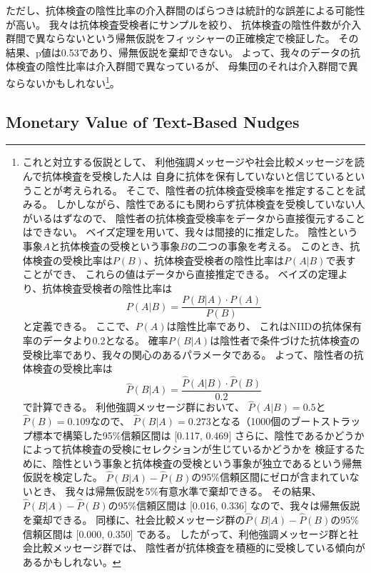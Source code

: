 \documentclass[
  11pt,
  a4paper,
]{article}
\begin{document}
ただし、抗体検査の陰性比率の介入群間のばらつきは統計的な誤差による可能性が高い。
我々は抗体検査受検者にサンプルを絞り、
抗体検査の陰性件数が介入群間で異ならないという帰無仮説をフィッシャーの正確検定で検証した。
その結果、p値は0.53であり、帰無仮説を棄却できない。
よって、我々のデータの抗体検査の陰性比率は介入群間で異なっているが、
母集団のそれは介入群間で異ならないかもしれない\footnote{これと対立する仮説として、
  利他強調メッセージや社会比較メッセージを読んで抗体検査を受検した人は
  自身に抗体を保有していないと信じているということが考えられる。
  そこで、陰性者の抗体検査受検率を推定することを試みる。
  しかしながら、陰性であるにも関わらず抗体検査を受検していない人がいるはずなので、
  陰性者の抗体検査受検率をデータから直接復元することはできない。
  ベイズ定理を用いて、我々は間接的に推定した。
  陰性という事象\(A\)と抗体検査の受検という事象\(B\)の二つの事象を考える。
  このとき、抗体検査の受検比率は\(P(B)\)、抗体検査受検者の陰性比率は\(P(A|B)\)で表すことができ、
  これらの値はデータから直接推定できる。
  ベイズの定理より、抗体検査受検者の陰性比率は
  \[ P(A|B) = \frac{P(B|A) \cdot P(A)}{P(B)} \]
  と定義できる。
  ここで、\(P(A)\)は陰性比率であり、
  これはNIIDの抗体保有率のデータより0.2となる。
  確率\(P(B|A)\)は陰性者で条件づけた抗体検査の受検比率であり、我々の関心のあるパラメータである。
  よって、陰性者の抗体検査の受検比率は
  \[ \hat{P}(B|A) = \frac{\hat{P}(A|B) \cdot \hat{P}(B)}{0.2} \]
  で計算できる。
  利他強調メッセージ群において、
  \(\hat{P}(A|B) = 0.5\)と\(\hat{P}(B) = 0.109\)なので、
  \(\hat{P}(B|A) = 0.273\)となる（1000個のブートストラップ標本で構築した95\%信頼区間は
  {[}0.117, 0.469{]}
  さらに、陰性であるかどうかによって抗体検査の受検にセレクションが生じているかどうかを
  検証するために、陰性という事象と抗体検査の受検という事象が独立であるという帰無仮説を検定した。
  \(\hat{P}(B|A) - \hat{P}(B)\)の95\%信頼区間にゼロが含まれていないとき、
  我々は帰無仮説を5\%有意水準で棄却できる。
  その結果、\(\hat{P}(B|A) - \hat{P}(B)\)の95\%信頼区間は
  {[}0.016, 0.336{]}
  なので、我々は帰無仮説を棄却できる。
  同様に、社会比較メッセージ群の\(\hat{P}(B|A) - \hat{P}(B)\)の95\%信頼区間は
  {[}0.000, 0.350{]}
  である。
  したがって、利他強調メッセージ群と社会比較メッセージ群では、
  陰性者が抗体検査を積極的に受検している傾向があるかもしれない。}。

\hypertarget{econvalue}{%
\subsection{Monetary Value of Text-Based Nudges}\label{econvalue}}
\end{document}
